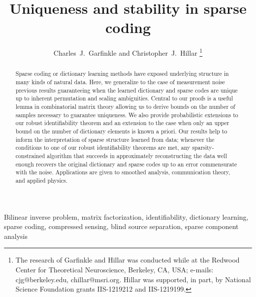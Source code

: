 \documentclass[journal, twocolumn]{IEEEtran}
\begin{document}
\title{Uniqueness and stability in sparse coding}

\author{Charles~J.~Garfinkle and Christopher~J.~Hillar
\thanks{The research of Garfinkle and Hillar was conducted while at the Redwood Center for Theoretical Neuroscience, Berkeley, CA, USA; e-mails: cjg@berkeley.edu, chillar@msri.org.  Hillar was supported, in part, by National Science Foundation grants IIS-1219212 and IIS-1219199.}}

\maketitle

\begin{abstract}
Sparse coding or dictionary learning methods have exposed underlying structure in many kinds of natural data. Here, we generalize to the case of measurement noise previous results guaranteeing when the learned dictionary and sparse codes are unique up to inherent permutation and scaling ambiguities.  Central to our proofs is a useful lemma in combinatorial matrix theory allowing us to derive bounds on the number of samples necessary to guarantee uniqueness. We also provide probabilistic extensions to our robust identifiability theorem and an extension to the case when only an upper bound on the number of dictionary elements is known a priori. Our results help to inform the interpretation of sparse structure learned from data; whenever the conditions to one of our robust identifiability theorems are met, any sparsity-constrained algorithm that succeeds in approximately reconstructing the data well enough recovers the original dictionary and sparse codes up to an error commensurate with the noise. Applications are given to smoothed analysis, communication theory, and applied physics.
\end{abstract}

\begin{IEEEkeywords}
Bilinear inverse problem, matrix factorization, identifiability, dictionary learning, sparse coding, compressed sensing, blind source separation, sparse component analysis
\end{IEEEkeywords}


\end{document}

